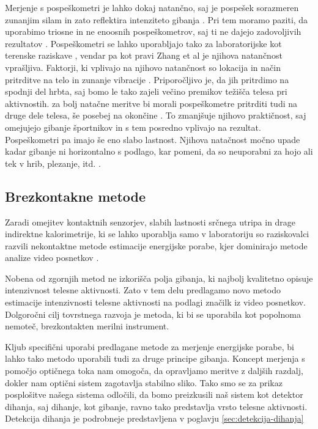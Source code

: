 Merjenje s pospeškometri je lahko dokaj natančno, saj je pospešek sorazmeren zunanjim silam in zato reflektira intenziteto gibanja \cite{yang2010review}. Pri tem moramo paziti, da uporabimo triosne in ne enoosnih pospeškometrov, saj ti ne dajejo zadovoljivih rezultatov \cite{levine2005measurement}. Pospeškometri se lahko uporabljajo tako za laboratorijske kot terenske raziskave \cite{yang2014sleep}, vendar pa kot pravi Zhang et al \cite{zhang2004improving} je njihova natančnost vprašljiva. Faktorji, ki vplivajo na njihovo natančnost so lokacija in način pritrditve na telo in zunanje vibracije \cite{yang2010review}. Priporočljivo je, da jih pritrdimo na spodnji del hrbta, saj bomo le tako zajeli večino premikov težišča telesa pri aktivnostih. za bolj natačne meritve bi morali pospeškometre pritrditi tudi na druge dele telesa, še posebej na okončine \cite{yang2010review}. To zmanjšuje njihovo praktičnost, saj omejujejo gibanje športnikov in s tem posredno vplivajo na rezultat. Pospeškometri pa imajo še eno slabo lastnost. Njihova natačnost močno upade kadar gibanje ni horizontalno s podlago, kar pomeni, da so neuporabni za hojo ali tek v hrib, plezanje, itd. \cite{yang2010review}.




\subsection{Brezkontakne metode}

Zaradi omejitev kontaktnih senzorjev, slabih lastnosti srčnega utripa in drage indirektne kalorimetrije, ki se lahko uporablja samo v laboratoriju so raziskovalci razvili nekontaktne metode estimacije energijske porabe, kjer dominirajo metode analize video posnetkov \cite{botton2011energy,osgnach2010energy,silva2015assessing,peker2004framework,nathan2015estimating}. 

Nobena od zgornjih metod ne izkorišča polja gibanja, ki najbolj kvalitetno opisuje intenzivnost telesne aktivnosti. Zato v tem delu predlagamo novo metodo estimacije intenzivnosti telesne aktivnosti na podlagi značilk iz video posnetkov. Dolgoročni cilj tovrstnega razvoja je metoda, ki bi se uporabila kot popolnoma nemoteč, brezkontakten merilni instrument.

Kljub specifični uporabi predlagane metode za merjenje energijske porabe, bi lahko tako metodo uporabili tudi za druge principe gibanja. Koncept merjenja s pomočjo optičnega toka nam omogoča, da opravljamo meritve z daljših razdalj, dokler nam optični sistem zagotavlja stabilno sliko. Tako smo se za prikaz posplošitve našega sistema odločili, da bomo preizkusili naš sistem kot detektor dihanja, saj dihanje, kot gibanje, ravno tako predstavlja vrsto telesne aktivnosti. Detekcija dihanja je podrobneje predstavljena v poglavju \ref{sec:detekcija-dihanja}